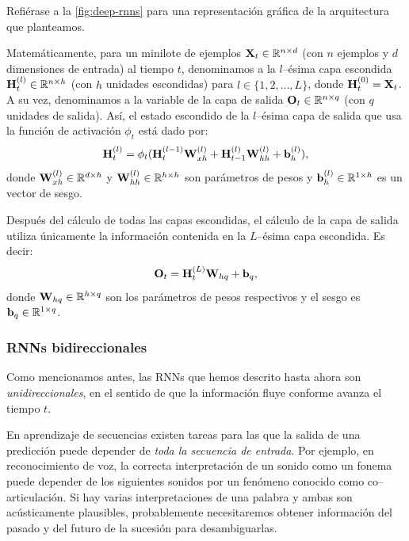 \documentclass[12pt]{article}
\newcommand{\R}{\mathbb{R}}
\newcommand{\X}{\bm{\textbf X}}
\newcommand{\hi}{\bm{\textbf H}}
\newcommand{\we}{\bm{\textbf W}}
\newcommand{\bi}{\bm{\textbf b}}
\newcommand{\out}{\bm{\textbf O}}
\begin{document}
Refiérase a la \cref{fig:deep-rnns} para una representación gráfica de la arquitectura que planteamos.

Matemáticamente, para un minilote de ejemplos $ \X_t \in \R^{n \times d} $ (con $ n $ ejemplos y $ d $ dimensiones de entrada) al tiempo $ t $, denominamos a la $ l $--ésima capa escondida $ \hi_t^{(l)} \in \R^{n \times h} $ (con $ h $ unidades escondidas) para $ l \in \{1, 2, \ldots, L\} $, donde $ \hi_t^{(0)} = \X_t $. A su vez, denominamos a la variable de la capa de salida $ \out_t \in \R^{n \times q} $ (con $ q $ unidades de salida). Así, el estado escondido de la $ l $--ésima capa de salida que usa la función de activación $ \phi_t $ está dado por:
\begin{equation}
    \hi_t^{(l)} = \phi_t(\hi_t^{(l-1)}\we_{xh}^{(l)} + \hi_{t-1}^{(l)}\we_{hh}^{(l)} + \bi_h^{(l)}),
\end{equation}
donde $ \we_{xh}^{(l)} \in \R^{d\times h} $ y $ \we_{hh}^{(l)} \in \R^{h \times h} $ son parámetros de pesos y $ \bi_h^{(l)} \in \R^{1 \times h} $ es un vector de sesgo.

Después del cálculo de todas las capas escondidas, el cálculo de la capa de salida utiliza únicamente la información contenida en la $ L $--ésima capa escondida. Es decir:
\begin{equation}
    \out_t = \hi_t^{(L)}\we_{hq} + \bi_q,
\end{equation}
donde $ \we_{hq} \in \R^{h \times q} $ son los parámetros de pesos respectivos y el sesgo es $ \bi_q \in \R^{1 \times q} $.

\subsubsection{RNNs bidireccionales}

Como mencionamos antes, las RNNs que hemos descrito hasta ahora son \textit{unidireccionales}, en el sentido de que la información fluye conforme avanza el tiempo $ t $.

En aprendizaje de secuencias existen tareas para las que la salida de una predicción puede depender de \textit{toda la secuencia de entrada}. Por ejemplo, en reconocimiento de voz, la correcta interpretación de un sonido como un fonema puede depender de los siguientes sonidos por un fenómeno conocido como co--articulación. Si hay varias interpretaciones de una palabra y ambas son acústicamente plausibles, probablemente necesitaremos obtener información del pasado y del futuro de la sucesión para desambiguarlas. 
\end{document}
